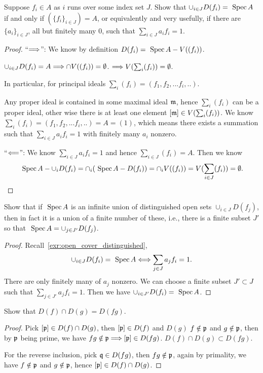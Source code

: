 \begin{exr}\label{exr:open_cover_distinguished}
Suppose $f_i \in A$ as $i$ runs over some index set $J$. Show that $\cup_{i\in J}D(f_i) = \text{ Spec\,} A$ if and only if $(\{f_i\}_{i\in J}) = A$, or equivalently and very usefully,
if there are $ \{a_i\}_{i\in J} $, all but finitely many $0$, such that 
$\sum_{i\in J}a_if_i = 1$.
\end{exr}
\begin{proof}
``$\Longrightarrow$'': We know by definition $D(f_i)=\text{ Spec\,} A-V((f_i))$.

$\cup_{i\in J}D(f_i)=A\Longrightarrow \cap V((f_i))=\emptyset$. $\Longrightarrow V(\sum_i(f_i))=\emptyset$.

In particular, for principal ideals 
$\sum_i(f_i)=(f_1,f_2,...f_i,..)$.

Any proper ideal is contained in some maximal ideal ${\mathfrak m}$, hence $\sum_i(f_i)$ can be a proper ideal, other wise there is at least one element $[{\mathfrak m}]\in V(\sum_i (f_i))$. We know $\sum_i(f_i)=(f_1,f_2,...f_i,..)=A=(1)$, which means there exists a summation such that $\sum_{i\in J}a_if_i = 1$ with finitely many $a_i$ nonzero.

``$\Longleftarrow$'': We know $\sum_{i\in J}a_if_i = 1$ and hence $\sum_{i\in J} (f_i)=A$. Then we know
$$
\text{ Spec\,} A-\cup_i D(f_i)=\cap_i (\text{ Spec\,} A-D(f_i))=\cap_i V((f_i))=V(\sum_{i\in J} (f_i))=\emptyset.
$$
\end{proof}


\begin{exr}\label{exr:distinguished_open_cover}
Show that if $\text{ Spec\,} A $ is an infinite union of distinguished open sets $\cup_{i\in J}D(f_j)$, then in fact it is a union of a finite number of these, i.e., there is a finite subset $J'$ so that $\text{ Spec\,} A = \cup_{j\in J'}  D(f_j)$. 
\end{exr}
\begin{proof}
Recall~\ref{exr:open_cover_distinguished},
$$
\cup_{i\in J}D(f_i) = \text{ Spec\,} A\Longleftrightarrow \sum_{j\in J}a_j f_i=1.
$$
There are only finitely many of $a_j$ nonzero. We can choose a finite subset $J'\subset J$ such that $\sum_{j\in J'}a_j f_i=1$. Then we have $\cup_{i\in J'}D(f_i) = \text{ Spec\,} A$.
\end{proof}

\begin{exr}\label{chap3exr:3.5.D}
Show that $D(f) \cap D(g) = D(fg)$.
\end{exr}
\begin{proof}
Pick $[{\mathfrak p}]\in D(f) \cap D(g)$, then $[{\mathfrak p}]\in D(f)$ and $D(g)$ $f\notin {\mathfrak p}$ and $g\notin {\mathfrak p}$, then by ${\mathfrak p}$ being prime, we have $fg\notin{\mathfrak p}\Longrightarrow [{\mathfrak p}]\in D(fg)$. $D(f) \cap D(g)\subset D(fg)$.

For the reverse inclusion, pick $\mathfrak q\in D(fg)$, then $fg\notin {\mathfrak p}$, again by primality, we have $f\notin{\mathfrak p}$ and $g\notin{\mathfrak p}$, hence $[{\mathfrak p}]\in D(f)\cap D(g)$.
\end{proof}



